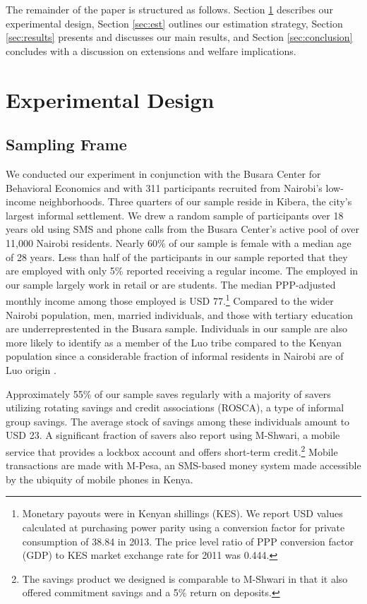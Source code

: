 \documentclass[12pt, titlepage]{article}
\begin{document}
	The remainder of the paper is structured as follows. Section \ref{sec:design} describes our experimental design, Section \ref{sec:est} outlines our estimation strategy, Section \ref{sec:results} presents and discusses our main results, and Section \ref{sec:conclusion} concludes with a discussion on extensions and welfare implications.

\section{Experimental Design} \label{sec:design}

	\subsection{Sampling Frame}

		We conducted our experiment in conjunction with the Busara Center for Behavioral Economics and with 311 participants recruited from Nairobi's low-income neighborhoods. Three quarters of our sample reside in Kibera, the city's largest informal settlement. We drew a random sample of participants over 18 years old using SMS and phone calls from the Busara Center's active pool of over 11,000 Nairobi residents. Nearly 60\% of our sample is female with a median age of 28 years. Less than half of the participants in our sample reported that they are employed with only 5\% reported receiving a regular income. The employed in our sample largely work in retail or are students. The median PPP-adjusted monthly income among those employed is USD 77.\footnote{Monetary payouts were in Kenyan shillings (KES). We report USD values calculated at purchasing power parity using a conversion factor for private consumption of 38.84 in 2013. The price level ratio of PPP conversion factor (GDP) to KES market exchange rate for 2011 was 0.444.} Compared to the wider Nairobi population, men, married individuals, and those with tertiary education are underreprestented in the Busara sample. Individuals in our sample are also more likely to identify as a member of the Luo tribe compared to the Kenyan population since a considerable fraction of informal residents in Nairobi are of Luo origin \parencite{haushofer_methodology_2014}.

		Approximately 55\% of our sample saves regularly with a majority of savers utilizing rotating savings and credit associations (ROSCA), a type of informal group savings. The average stock of savings among these individuals amount to USD 23. A significant fraction of savers also report using M-Shwari, a mobile service that provides a lockbox account and offers short-term credit.\footnote{The savings product we designed is comparable to M-Shwari in that it also offered commitment savings and a 5\% return on deposits.} Mobile transactions are made with M-Pesa, an SMS-based money system made accessible by the ubiquity of mobile phones in Kenya.
\end{document}
